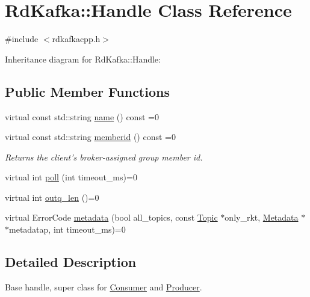 \hypertarget{classRdKafka_1_1Handle}{\section{Rd\-Kafka\-:\-:Handle Class Reference}
\label{classRdKafka_1_1Handle}
}


{\ttfamily \#include $<$rdkafkacpp.\-h$>$}



Inheritance diagram for Rd\-Kafka\-:\-:Handle\-:
\subsection*{Public Member Functions}
\begin{DoxyCompactItemize}
\item 
virtual const std\-::string \hyperlink{classRdKafka_1_1Handle_abaa74be1b5b15784d47bc9c97edd0b9c}{name} () const =0
\item 
virtual const std\-::string \hyperlink{classRdKafka_1_1Handle_ae0395b131921c05554688202fc0160a4}{memberid} () const =0
\begin{DoxyCompactList}\small\item\em Returns the client's broker-\/assigned group member id. \end{DoxyCompactList}\item 
virtual int \hyperlink{classRdKafka_1_1Handle_a98d3b4ee48457ff13e4d5155e3fc5ea4}{poll} (int timeout\-\_\-ms)=0
\item 
virtual int \hyperlink{classRdKafka_1_1Handle_a5ea17c83faa627056fca792be4ec6616}{outq\-\_\-len} ()=0
\item 
virtual Error\-Code \hyperlink{classRdKafka_1_1Handle_ac0cc63c574ce027a184640645151a75c}{metadata} (bool all\-\_\-topics, const \hyperlink{classRdKafka_1_1Topic}{Topic} $\ast$only\-\_\-rkt, \hyperlink{classRdKafka_1_1Metadata}{Metadata} $\ast$$\ast$metadatap, int timeout\-\_\-ms)=0
\end{DoxyCompactItemize}


\subsection{Detailed Description}
Base handle, super class for \hyperlink{classRdKafka_1_1Consumer}{Consumer} and \hyperlink{classRdKafka_1_1Producer}{Producer}. 

